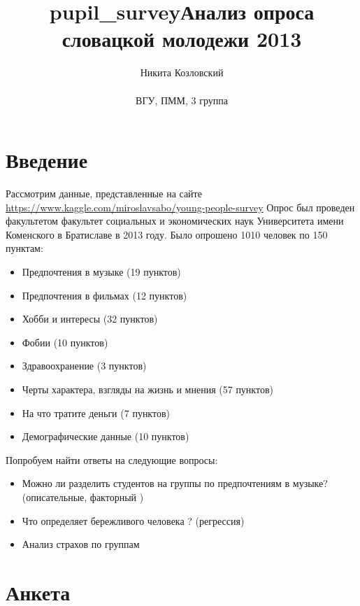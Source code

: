 \documentclass[11pt]{article}
\title{pupil\_survey}
\begin{document}
    
    
    \title{Анализ опроса словацкой молодежи 2013}
    \author
{Никита Козловский\\
\\
\normalsize{ВГУ, ПММ, 3 группа}\\}
\date{}
\maketitle

\section{Введение}
    Рассмотрим данные, представленные на сайте \url{https://www.kaggle.com/miroslavsabo/young-people-survey}
	Опрос был проведен факультетом факультет социальных и экономических наук Университета имени Коменского в Братиславе в 2013 году. Было опрошено 1010 человек по 150 пунктам: 
	\begin{itemize}
\item Предпочтения в музыке (19 пунктов)
\item Предпочтения в фильмах (12 пунктов)
\item Хобби и интересы (32 пунктов)
\item Фобии (10 пунктов)
\item Здравоохранение (3 пунктов)
\item Черты характера, взгляды на жизнь и мнения (57 пунктов)
\item На что тратите деньги (7 пунктов)
\item Демографические данные (10 пунктов)
\end{itemize}

Попробуем найти ответы на следующие вопросы:
	\begin{itemize}
\item Можно ли разделить студентов на группы по предпочтениям в музыке? (описательные, факторный )
\item Что определяет бережливого человека ? (регрессия) 
\item Анализ страхов по группам 
\end{itemize}
    
\pagebreak
\section{Анкета}
\end{document}
